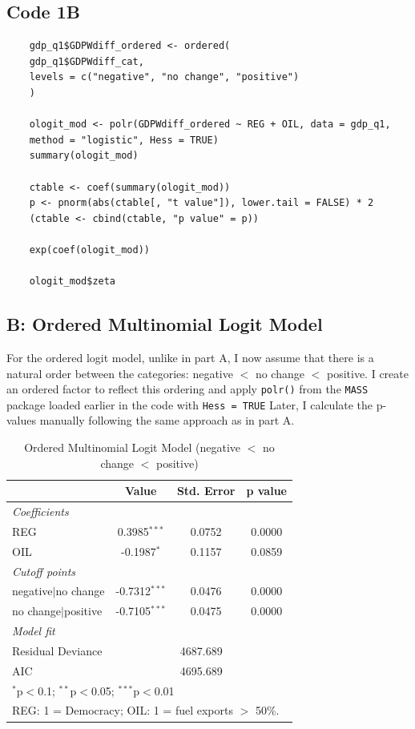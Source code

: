 \documentclass[12pt,letterpaper]{article}
\begin{document}
\subsection{Code 1B}

\tiny \begin{BVerbatim}
	gdp_q1$GDPWdiff_ordered <- ordered(
	gdp_q1$GDPWdiff_cat,
	levels = c("negative", "no change", "positive")
	)
	
	ologit_mod <- polr(GDPWdiff_ordered ~ REG + OIL, data = gdp_q1,
	method = "logistic", Hess = TRUE)
	summary(ologit_mod)
	
	ctable <- coef(summary(ologit_mod))
	p <- pnorm(abs(ctable[, "t value"]), lower.tail = FALSE) * 2
	(ctable <- cbind(ctable, "p value" = p))
	
	exp(coef(ologit_mod))
	
	ologit_mod$zeta
\end{BVerbatim}
\normalsize \newline
\subsection{B: Ordered Multinomial Logit Model}
\noindent For the ordered logit model, unlike in part A, I now assume that there is a natural order between the categories: negative $<$ no change $<$ positive.  I create an ordered factor to reflect this ordering and apply \texttt{polr()} from the \texttt{MASS} package loaded earlier in the code with \texttt{Hess = TRUE} Later, I calculate the p-values manually following the same approach as in part A.\newline

\begin{table}[H]
	\centering
	\caption{Ordered Multinomial Logit Model (negative $<$ no change $<$ positive)}
	\label{tab:ologit}
	\begin{tabular}{lccc}
		\hline\hline
		& Value   & Std. Error & p value \\
		\hline
		\multicolumn{4}{l}{\textit{Coefficients}} \\
		REG                & 0.3985$^{***}$ & 0.0752 & 0.0000 \\
		OIL                & -0.1987$^{*}$  & 0.1157 & 0.0859 \\
		\hline
		\multicolumn{4}{l}{\textit{Cutoff points}} \\
		negative$|$no change & -0.7312$^{***}$ & 0.0476 & 0.0000 \\
		no change$|$positive & -0.7105$^{***}$ & 0.0475 & 0.0000 \\
		\hline
		\multicolumn{4}{l}{\textit{Model fit}} \\
		Residual Deviance  & \multicolumn{3}{c}{4687.689} \\
		AIC                & \multicolumn{3}{c}{4695.689} \\
		\hline\hline
		\multicolumn{4}{l}{\footnotesize $^{*}$p$<$0.1; $^{**}$p$<$0.05; $^{***}$p$<$0.01} \\
		\multicolumn{4}{l}{\footnotesize REG: 1 = Democracy; OIL: 1 = fuel exports $>$ 50\%.} \\
	\end{tabular}
\end{table}
\end{document}
